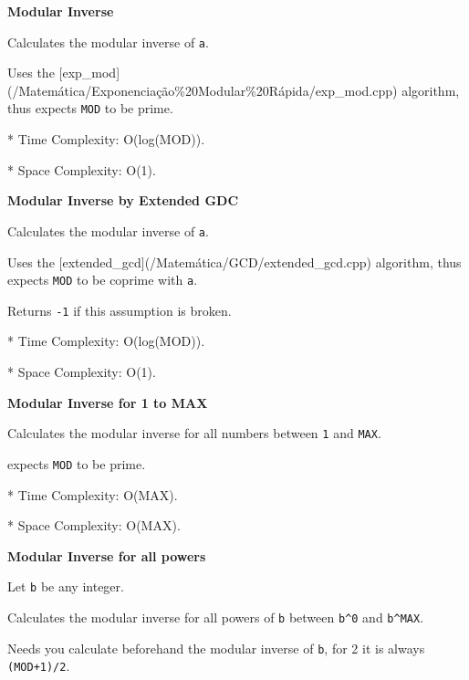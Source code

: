 \documentclass[11pt, a4paper, oneside]{book}
\begin{document}
\textbf{Modular Inverse} 



Calculates the modular inverse of \lstinline{a}.



Uses the [exp\_mod](/Matemática/Exponenciação\%20Modular\%20Rápida/exp\_mod.cpp) algorithm, thus expects \lstinline{MOD} to be prime.



* Time Complexity: O(log(MOD)).

* Space Complexity: O(1).



\textbf{Modular Inverse by Extended GDC} 



Calculates the modular inverse of \lstinline{a}.



Uses the [extended\_gcd](/Matemática/GCD/extended\_gcd.cpp) algorithm, thus expects \lstinline{MOD} to be coprime with \lstinline{a}.



Returns \lstinline{-1} if this assumption is broken.



* Time Complexity: O(log(MOD)).

* Space Complexity: O(1).



\textbf{Modular Inverse for 1 to MAX} 



Calculates the modular inverse for all numbers between \lstinline{1} and \lstinline{MAX}.



expects \lstinline{MOD} to be prime.



* Time Complexity: O(MAX).

* Space Complexity: O(MAX).



\textbf{Modular Inverse for all powers} 



Let \lstinline{b} be any integer.



Calculates the modular inverse for all powers of \lstinline{b} between \lstinline{b^0} and \lstinline{b^MAX}.



Needs you calculate beforehand the modular inverse of \lstinline{b}, for 2 it is always \lstinline{(MOD+1)/2}.
\end{document}
